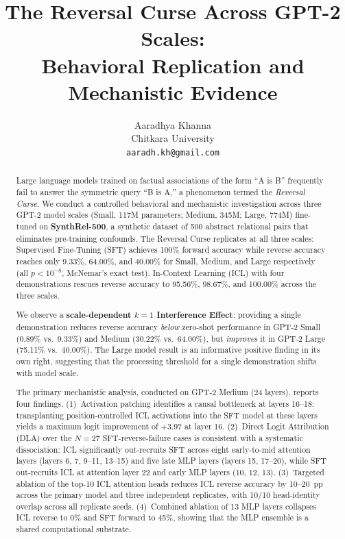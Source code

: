 \documentclass[11pt]{article}
\title{The Reversal Curse Across GPT-2 Scales:\\
Behavioral Replication and Mechanistic Evidence}
\author{
  Aaradhya Khanna \\
  Chitkara University \\
  \texttt{aaradh.kh@gmail.com}
}
\date{}
\begin{document}
\maketitle

\begin{abstract}

Large language models trained on factual associations of the form
``A is B'' frequently fail to answer the symmetric query ``B is A,'' a
phenomenon termed the \emph{Reversal Curse}. We conduct a controlled
behavioral and mechanistic investigation across three GPT-2 model scales
(Small, 117M parameters; Medium, 345M; Large, 774M) fine-tuned on
\textbf{SynthRel-500}, a synthetic dataset of 500 abstract relational pairs
that eliminates pre-training confounds. The Reversal Curse replicates at all
three scales: Supervised Fine-Tuning (SFT) achieves 100\% forward accuracy
while reverse accuracy reaches only 9.33\%, 64.00\%, and 40.00\% for Small,
Medium, and Large respectively (all $p < 10^{-8}$, McNemar's exact test).
In-Context Learning (ICL) with four demonstrations rescues reverse accuracy to
95.56\%, 98.67\%, and 100.00\% across the three scales.

We observe a \textbf{scale-dependent $k=1$ Interference Effect}: providing a
single demonstration reduces reverse accuracy \emph{below} zero-shot performance
in GPT-2 Small (0.89\% vs.\ 9.33\%) and Medium (30.22\% vs.\ 64.00\%), but
\emph{improves} it in GPT-2 Large (75.11\% vs.\ 40.00\%). The Large model
result is an informative positive finding in its own right, suggesting that
the processing threshold for a single demonstration shifts with model scale.

The primary mechanistic analysis, conducted on GPT-2 Medium (24 layers), reports
four findings. (1)~Activation patching identifies a causal bottleneck at layers
16--18: transplanting position-controlled ICL activations into the SFT model at
these layers yields a maximum logit improvement of $+3.97$ at layer 16.
(2)~Direct Logit Attribution (DLA) over the $N=27$ SFT-reverse-failure cases
is consistent with a systematic dissociation: ICL significantly out-recruits SFT
across eight early-to-mid attention layers (layers 6, 7, 9--11, 13--15) and five
late MLP layers (layers 15, 17--20), while SFT out-recruits ICL at attention
layer 22 and early MLP layers (10, 12, 13). (3)~Targeted ablation of the top-10
ICL attention heads reduces ICL reverse accuracy by 10--20~pp across the primary
model and three independent replicates, with 10/10 head-identity overlap across
all replicate seeds. (4)~Combined ablation of 13 MLP layers collapses ICL
reverse to 0\% and SFT forward to 45\%, showing that the MLP ensemble is a
shared computational substrate.


\end{abstract}
\end{document}

